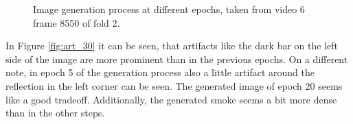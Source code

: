 \begin{figure}[tb]
    \centering
    \hfill
    
    \vspace{0.5cm}
    
    \hfill
    \caption[Image generation of CycleGAN]{Image generation process at different epochs, taken from video 6 frame 8550 of fold 2.}\label{fig:cycle_img_train}
\end{figure}
In Figure \ref{fig:art_30} it can be seen, that artifacts like the dark bar on the left side of the image are more prominent than in the previous epochs.
On a different note, in epoch 5 of the generation process also a little artifact around the reflection in the left corner can be seen.
The generated image of epoch 20 seems like a good tradeoff. Additionally, the generated smoke seems a bit more dense than in the other steps.\\

